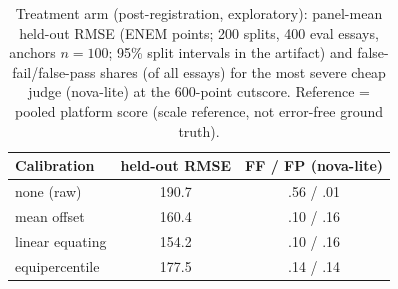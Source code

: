 \begin{table}[t]\centering\caption{Treatment arm (post-registration, exploratory): panel-mean held-out RMSE (ENEM points; 200 splits, 400 eval essays, anchors $n{=}100$; 95\% split intervals in the artifact) and false-fail/false-pass shares (of all essays) for the most severe cheap judge (nova-lite) at the 600-point cutscore. Reference = pooled platform score (scale reference, not error-free ground truth).}
\label{tab:treat}\small\begin{tabular}{lcc}\toprule
Calibration & held-out RMSE & FF / FP (nova-lite) \\ \midrule
none (raw) & 190.7 & .56 / .01 \\
mean offset & 160.4 & .10 / .16 \\
linear equating & 154.2 & .10 / .16 \\
equipercentile & 177.5 & .14 / .14 \\
\bottomrule\end{tabular}\end{table}
